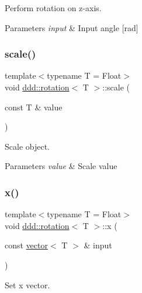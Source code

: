 Perform rotation on z-\/axis. 


\begin{DoxyParams}{Parameters}
{\em input} & Input angle \mbox{[}rad\mbox{]} \\
\hline
\end{DoxyParams}
\mbox{\label{classddd_1_1rotation_ab4911ee3dd5709e25f6dc7db6bad2c21}} 
\subsubsection{\texorpdfstring{scale()}{scale()}}
{\footnotesize\ttfamily template$<$typename T  = Float$>$ \\
void \hyperlink{classddd_1_1rotation}{ddd\+::rotation}$<$ T $>$\+::scale (\begin{DoxyParamCaption}\item[{const T \&}]{value }\end{DoxyParamCaption})\hspace{0.3cm}{\ttfamily [inline]}}



Scale object. 


\begin{DoxyParams}{Parameters}
{\em value} & Scale value \\
\hline
\end{DoxyParams}
\mbox{\label{classddd_1_1rotation_ab1d32f426452f5fc28844c1c7ba486c6}} 
\subsubsection{\texorpdfstring{x()}{x()}}
{\footnotesize\ttfamily template$<$typename T  = Float$>$ \\
void \hyperlink{classddd_1_1rotation}{ddd\+::rotation}$<$ T $>$\+::x (\begin{DoxyParamCaption}\item[{const \hyperlink{classddd_1_1vector}{vector}$<$ T $>$ \&}]{input }\end{DoxyParamCaption})\hspace{0.3cm}{\ttfamily [inline]}}



Set x vector. 


